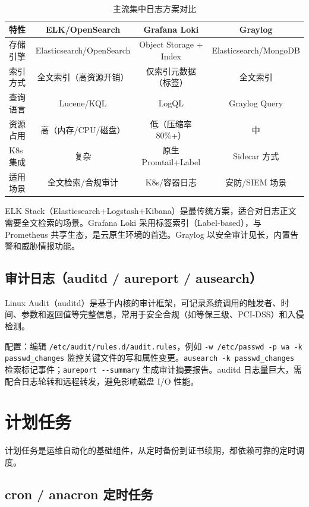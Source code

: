 \documentclass[12pt,UTF8]{ctexbook}
\begin{document}
\begin{table}[htbp]
	\centering
	\caption{主流集中日志方案对比}
	\begin{tabular}{@{}lccc@{}}
		\toprule
		\textbf{特性} & \textbf{ELK/OpenSearch} & \textbf{Grafana Loki} & \textbf{Graylog} \\
		\midrule
		存储引擎 & Elasticsearch/OpenSearch & Object Storage + Index & Elasticsearch/MongoDB \\
		索引方式 & 全文索引（高资源开销） & 仅索引元数据（标签） & 全文索引 \\
		查询语言 & Lucene/KQL & LogQL & Graylog Query \\
		资源占用 & 高（内存/CPU/磁盘） & 低（压缩率 80\%+） & 中 \\
		K8s 集成 & 复杂 & 原生 Promtail+Label & Sidecar 方式 \\
		适用场景 & 全文检索/合规审计 & K8s/容器日志 & 安防/SIEM 场景 \\
		\bottomrule
	\end{tabular}
\end{table}

ELK Stack（Elasticsearch+Logstash+Kibana）是最传统方案，适合对日志正文需要全文检索的场景。Grafana Loki 采用标签索引（Label-based），与 Prometheus 共享生态，是云原生环境的首选。Graylog 以安全审计见长，内置告警和威胁情报功能。

    \subsection{审计日志（auditd / aureport / ausearch）}

Linux Audit（auditd）是基于内核的审计框架，可记录系统调用的触发者、时间、参数和返回值等完整信息，常用于安全合规（如等保三级、PCI-DSS）和入侵检测。

配置：编辑 \verb|/etc/audit/rules.d/audit.rules|，例如 \verb|-w /etc/passwd -p wa -k passwd_changes| 监控关键文件的写和属性变更。\verb|ausearch -k passwd_changes| 检索标记事件；\verb|aureport --summary| 生成审计摘要报告。auditd 日志量巨大，需配合日志轮转和远程转发，避免影响磁盘 I/O 性能。

  \section{计划任务}

计划任务是运维自动化的基础组件，从定时备份到证书续期，都依赖可靠的定时调度。

    \subsection{cron / anacron 定时任务}
\end{document}
